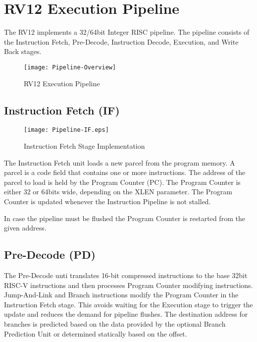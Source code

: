 \chapter{RV12 Execution Pipeline}

The RV12 implements a 32/64bit Integer RISC pipeline. The pipeline consists of the Instruction Fetch, Pre-Decode, Instruction Decode, Execution, and Write Back stages.
 

\begin{figure}[h]
  \texttt{[image: Pipeline-Overview]}
  \caption{RV12 Execution Pipeline}
\end{figure}

\pagebreak

\section{Instruction Fetch (IF)}\label{instruction-fetch-if}

\begin{figure}[h]
  \texttt{[image: Pipeline-IF.eps]}
  \caption{Instruction Fetch Stage Implementation}
\end{figure}

The Instruction Fetch unit loads a new parcel from the program memory.
A parcel is a code field that contains one or more instructions. The address of the parcel to load is held by the Program Counter (PC). The Program Counter is either 32 or 64bits wide, depending on the XLEN parameter. The Program Counter is updated whenever the Instruction Pipeline is not stalled.

In case the pipeline must be flushed the Program Counter is restarted from the given address.

\pagebreak

\section{Pre-Decode (PD)}\label{pre-decode-pd}

The Pre-Decode unti translates 16-bit compressed instructions to the base 32bit RISC-V instructions and then processes Program Counter modifying instructions. Jump-And-Link and Branch instructions modify the Program Counter in the Instruction Fetch stage. This avoids waiting for the Execution stage to trigger the update and reduces the demand for pipeline flushes.
The destination address for branches is predicted based on the data provided by the optional Branch Prediction Unit or determined statically based on the offset.


